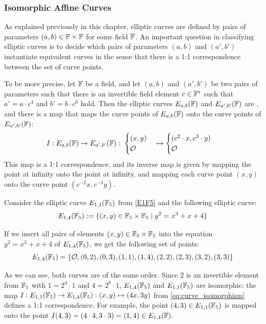 \subsubsection{Isomorphic Affine  Curves}
\label{sec:isomorphic_curves} As explained previously in this chapter, elliptic curves are defined by pairs of parameters $(a, b)\in \mathbb{F}\times \mathbb{F}$ for some field $\mathbb{F}$. An important question in classifying elliptic curves is to decide which pairs of parameters $(a,b)$ and $(a',b')$ instantiate equivalent curves in the sense that there is a 1:1 correspondence between the set of curve points.

To be more precise, let $\mathbb{F}$ be a field, and let $(a,b)$ and $(a',b')$ be two pairs of parameters such that there is an invertible field element $c\in \mathbb{F}^*$ such that $a' = a\cdot c^4$ and $b' = b\cdot c^6$ hold. Then the elliptic curves $E_{a,b}(\mathbb{F})$ and $E_{a',b'}(\mathbb{F})$ are , and there is a map that maps the curve points of $E_{a,b}(\mathbb{F})$ onto the curve points of $E_{a',b'}(\mathbb{F})$:
\begin{equation}
\label{eq:curve_isomorphism}
I: E_{a,b}(\mathbb{F}) \to E_{a',b'}(\mathbb{F}):\; \begin{cases}(x,y)\\\mathcal{O}\end{cases}
\mapsto \begin{cases}(c^2\cdot x,c^3\cdot y)\\\mathcal{O}\end{cases}
\end{equation}
This map is a 1:1 correspondence, and its inverse map is given by mapping the point at infinity onto the point at infinity, and mapping each curve point $(x,y)$ onto the curve point $(c^{-2}x,c^{-3}y)$.
\begin{example}
\label{ex:isomorphic_E1F5}
 Consider the  elliptic curve $E_{1,1}(\mathbb{F}_5)$ from \examplename{} \ref{E1F5} and the following elliptic curve:
\begin{equation}
E_{1,4}(\mathbb{F}_5):= \{(x,y)\in \mathbb{F}_5\times \mathbb{F}_5 \; | \; y^2 = x^3 + x + 4 \}
\end{equation}

If we insert all pairs of elements $(x,y)\in \mathbb{F}_5\times \mathbb{F}_5$ into the  equation $y^2 = x^3 + x + 4$ of $E_{1,4}(\mathbb{F}_5)$, we get the following set of points:
\begin{equation}
E_{1,4}(\mathbb{F}_5) = \{
\mathcal{O}, (0,2), (0,3), (1,1), (1,4), (2,2), (2,3), (3,2), (3,3)\}
\end{equation}

As we can see, both curves are of the same order. Since $2$ is an invertible element from $\mathbb{F}_5$ with $1 = 2^4\cdot 1$ and $4=2^6\cdot 1$, $E_{1,4}(\mathbb{F}_5)$ and $E_{1,1}(\mathbb{F}_5)$ are isomorphic: the map $I: E_{1,1}(\mathbb{F}_5)\to E_{1,4}(\mathbb{F}_5): (x,y)\mapsto (4x,3y)$ from \ref{eq:curve_isomorphism} defines a 1:1 correspondence. For example, the point $(4,3)\in E_{1,1}(\mathbb{F}_5)$ is mapped onto the point $I(4,3)=(4\cdot 4, 3\cdot 3) = (1,4)\in E_{1,4}(\mathbb{F})$.
\end{example}
  

